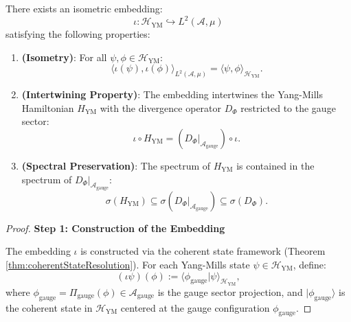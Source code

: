 \begin{theorem}
\label{thm:explicitHilbertSpaceEmbedding}

There exists an isometric embedding:
\begin{equation}
\iota : \mathcal{H}_{\mathrm{YM}} \hookrightarrow L^2(\mathcal{A}, \mu)
\end{equation}
satisfying the following properties:

\begin{enumerate}

\item \textbf{(Isometry)}: For all $\psi, \phi \in \mathcal{H}_{\mathrm{YM}}$:
\begin{equation}
\langle \iota(\psi), \iota(\phi) \rangle_{L^2(\mathcal{A}, \mu)} = \langle \psi, \phi \rangle_{\mathcal{H}_{\mathrm{YM}}}.
\end{equation}

\item \textbf{(Intertwining Property)}: The embedding intertwines the Yang-Mills Hamiltonian $H_{\mathrm{YM}}$ with the divergence operator $D_\Phi$ restricted to the gauge sector:
\begin{equation}
\iota \circ H_{\mathrm{YM}} = (D_\Phi|_{\mathcal{A}_{\mathrm{gauge}}}) \circ \iota.
\end{equation}

\item \textbf{(Spectral Preservation)}: The spectrum of $H_{\mathrm{YM}}$ is contained in the spectrum of $D_\Phi|_{\mathcal{A}_{\mathrm{gauge}}}$:
\begin{equation}
\sigma(H_{\mathrm{YM}}) \subseteq \sigma(D_\Phi|_{\mathcal{A}_{\mathrm{gauge}}}) \subseteq \sigma(D_\Phi).
\end{equation}

\end{enumerate}

\begin{proof}

\textbf{Step 1: Construction of the Embedding}

The embedding $\iota$ is constructed via the coherent state framework (Theorem \ref{thm:coherentStateResolution}). For each Yang-Mills state $\psi \in \mathcal{H}_{\mathrm{YM}}$, define:
\begin{equation}
(\iota \psi)(\phi) := \langle \phi_{\mathrm{gauge}} | \psi \rangle_{\mathcal{H}_{\mathrm{YM}}},
\end{equation}
where $\phi_{\mathrm{gauge}} = \Pi_{\mathrm{gauge}}(\phi) \in \mathcal{A}_{\mathrm{gauge}}$ is the gauge sector projection, and $|\phi_{\mathrm{gauge}}\rangle$ is the coherent state in $\mathcal{H}_{\mathrm{YM}}$ centered at the gauge configuration $\phi_{\mathrm{gauge}}$.


\end{proof}
\end{theorem}
